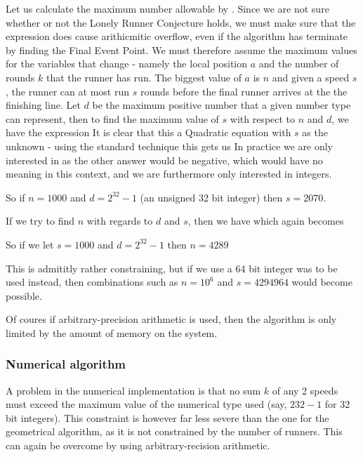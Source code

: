 Let us calculate the maximum number allowable by . Since we are not sure whether or not the Lonely Runner Conjecture holds, we must make sure that the expression does cause arithicmitic overflow, even if the algorithm has terminate by finding the Final Event Point. We must therefore assume the maximum values for the variables that change - namely the local position $a$ and the number of rounds $k$ that the runner has run. The biggest value of $a$ is $n$ and given a speed $s$, the runner can at most run $s$ rounds before the final runner arrives at the the finishing line. Let $d$ be the maximum positive number that a given number type can represent, then to find the maximum value of $s$ with respect to $n$ and $d$, we have the expression 
It is clear that this a Quadratic equation with $s$ as the unknown - using the standard technique this gets us
In practice we are only interested in
as the other answer would be negative, which would have no meaning in this context, and we are furthermore only interested in integers.

So if $n = 1000$ and $d = 2^{32}-1$ (an unsigned 32 bit integer) then $s = 2070$.

If we try to find $n$ with regards to $d$ and $s$, then we have
which again becomes

So if we let $s = 1000$ and $d = 2^{32}-1$ then $n = 4289$

This is admititly rather constraining, but if we use a 64 bit integer was to be used instead, then combinations such as $n = 10^6$ and $s = 4294964$ would become possible.

Of coures if arbitrary-precision arithmetic is used, then the algorithm is only limited by the amount of memory on the system.

\subsubsection{Numerical algorithm}
A problem in the numerical implementation is that no sum $k$ of any 2 speeds must exceed the maximum value of the numerical type used (say, $2 {32} - 1$ for 32 bit integers). This constraint is however far less severe than the one for the geometrical algorithm, as it is not constrained by the number of runners. This can again be overcome by using arbitrary-recision arithmetic.
